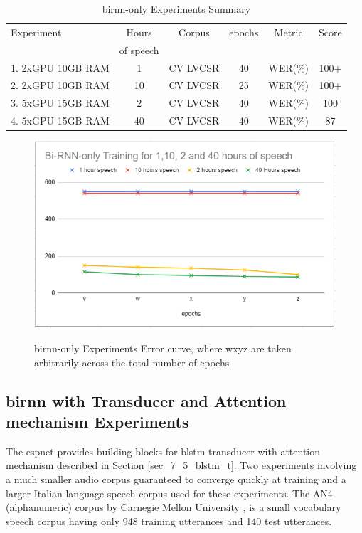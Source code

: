 \begin{table}
  \caption{\acrshort{birnn}-only Experiments Summary}
  \label{tab_c6_02_training}
\begin{tabular}{lccccc}
\toprule
Experiment & Hours & Corpus & epochs & Metric & Score\\& of speech\\
\midrule
1. 2xGPU 10GB RAM & 1 & CV LVCSR & 40 & WER(\%) & 100+\\
2. 2xGPU 10GB RAM & 10 & CV LVCSR & 25 & WER(\%) & 100+\\
3. 5xGPU 15GB RAM & 2 & CV LVCSR & 40 & WER(\%) & 100\\
4. 5xGPU 15GB RAM & 40 &  CV LVCSR & 40 & WER(\%) & 87\\
\bottomrule
\end{tabular}
\end{table}


\begin{figure}
\centering
  \includegraphics[width=14cm]{thesis/images/brnn_only.png}\\
  \caption{\acrshort{birnn}-only Experiments Error curve, where w\<x\<y\<z are taken arbitrarily across the total
number of epochs} \label{fig_6_3_wer}
\end{figure}


\subsection{\acrshort{birnn} with Transducer and Attention mechanism Experiments}
The \acrfull{espnet} \citep{watanabe2018espnet} provides building blocks for \acrshort{blstm} transducer with attention mechanism  described in Section \ref{sec_7_5_blstm_t}.  Two experiments involving a much smaller audio corpus guaranteed to converge quickly at training and a larger Italian language speech corpus \citep{foxvorge2019} used for these experiments.  The AN4 (alphanumeric) corpus by Carnegie Mellon University \citep{acero1990acoustical}, is a small vocabulary speech corpus having only 948 training utterances and 140 test utterances.

